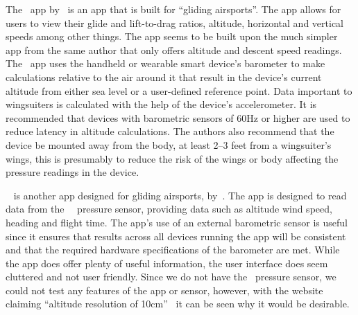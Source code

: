 \documentclass[twocolumn]{article}
\begin{document}
The~ app by~\textcite{pfm_technologies_llc_l/d_2015} is an app that is built for ``gliding airsports''. The app allows for users to view their glide and lift-to-drag ratios, altitude, horizontal and vertical speeds among other things. The app seems to be built upon the much simpler~ app from the same author that only offers altitude and descent speed readings.
The~ app uses the handheld or wearable smart device's barometer to make calculations relative to the air around it that result in the device's current altitude from either sea level or a user-defined reference point. Data important to wingsuiters is calculated with the help of the device's accelerometer. It is recommended that devices with barometric sensors of 60Hz or higher are used to reduce latency in altitude calculations. The authors also recommend that the device be mounted away from the body, at least 2--3 feet from a wingsuiter's wings, this is presumably to reduce the risk of the wings or body affecting the pressure readings in the device.

~ is another app designed for gliding airsports, by~\textcite{dickie_blueflyvario_2016}. The app is designed to read data from the~~\cite{noauthor_blueflyvario_nodate} pressure sensor, providing data such as altitude wind speed, heading and flight time.
The app's use of an external barometric sensor is useful since it ensures that results across all devices running the app will be consistent and that the required hardware specifications of the barometer are met.
While the app does offer plenty of useful information, the user interface does seem cluttered and not user friendly. Since we do not have the~ pressure sensor, we could not test any features of the app or sensor, however, with the website claiming ``altitude resolution of 10cm''~\cite{noauthor_blueflyvario_nodate} it can be seen why it would be desirable.
\end{document}
